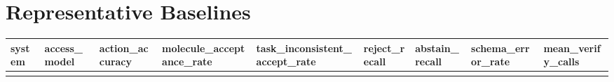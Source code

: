 \section{Representative Baselines}\label{representative-baselines}

{\def\LTcaptype{none} %
\begin{longtable}[]{@{}
  >{\raggedright\arraybackslash}p{}
  >{\raggedright\arraybackslash}p{}
  >{\raggedright\arraybackslash}p{}
  >{\raggedright\arraybackslash}p{}
  >{\raggedright\arraybackslash}p{}
  >{\raggedright\arraybackslash}p{}
  >{\raggedright\arraybackslash}p{}
  >{\raggedright\arraybackslash}p{}
  >{\raggedright\arraybackslash}p{}@{}}
\toprule\noalign{}
\begin{minipage}[b]{\linewidth}\raggedright
system
\end{minipage} & \begin{minipage}[b]{\linewidth}\raggedright
access\_model
\end{minipage} & \begin{minipage}[b]{\linewidth}\raggedright
action\_accuracy
\end{minipage} & \begin{minipage}[b]{\linewidth}\raggedright
molecule\_acceptance\_rate
\end{minipage} & \begin{minipage}[b]{\linewidth}\raggedright
task\_inconsistent\_accept\_rate
\end{minipage} & \begin{minipage}[b]{\linewidth}\raggedright
reject\_recall
\end{minipage} & \begin{minipage}[b]{\linewidth}\raggedright
abstain\_recall
\end{minipage} & \begin{minipage}[b]{\linewidth}\raggedright
schema\_error\_rate
\end{minipage} & \begin{minipage}[b]{\linewidth}\raggedright
mean\_verify\_calls
\end{minipage} \\
\midrule\noalign{}

\end{longtable}}
